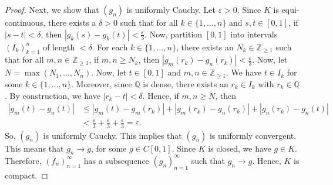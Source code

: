 \documentclass[a4paper, openany]{memoir}
\theoremstyle{definition}
\theoremstyle{plain}
\begin{document}
\begin{proof}
        Next, we show that $(g_n)$ is uniformly Cauchy. Let $\varepsilon > 0$. Since $K$ is equi-continuous, there exists a $\delta > 0$ such that for all $k \in \{1, \dots, n\}$ and $s, t \in [0, 1]$, if $|s - t| < \delta$, then $|g_k(s) - g_k(t)| < \frac{\varepsilon}{3}$. Now, partition $[0, 1]$ into intervals $(I_k)_{k=1}^n$ of length $< \delta$. For each $k \in \{1, \dots, n\}$, there exists an $N_k \in \mathbb{Z}_{\geq 1}$ such that for all $m, n \in \mathbb{Z}_{\geq 1}$, if $m, n \geq N_k$, then $|g_m(r_k) - g_n(r_k)| < \frac{\varepsilon}{3}$. Now, let $N = \max(N_1, \dots, N_n)$. Now, let $t \in [0, 1]$ and $m, n \in \mathbb{Z}_{\geq 1}$. We have $t \in I_k$ for some $k \in \{1, \dots, n\}$. Moreover, since $\mathbb{Q}$ is dense, there exists an $r_k \in I_k$ with $r_k \in \mathbb{Q}$. By construction, we have $|r_k - t| < \delta$. Hence, if $m, n \geq N$, then
        \begin{align*}
            |g_m(t) - g_n(t)| &\leq |g_m(t) - g_m(r_k)| + |g_m(r_k) - g_n(r_k)| + |g_n(r_k) - g_n(t)| \\
            &< \frac{\varepsilon}{3} + \frac{\varepsilon}{3} + \frac{\varepsilon}{3} = \varepsilon.
        \end{align*}
        So, $(g_n)$ is uniformly Cauchy. This implies that $(g_n)$ is uniformly convergent. This means that $g_n \to g$, for some $g \in C[0, 1]$. Since $K$ is closed, we have $g \in K$. Therefore, $(f_n)_{n=1}^\infty$ has a subsequence $(g_n)_{n=1}^\infty$ such that $g_n \to g$. Hence, $K$ is compact.
    \end{proof}


\end{document}
